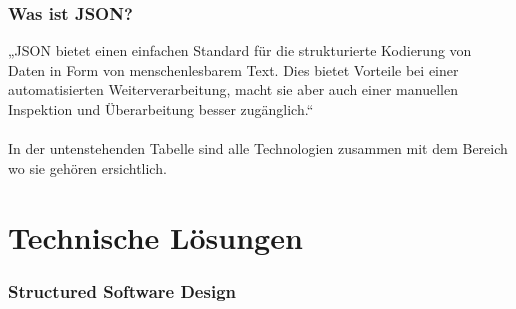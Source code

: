 \subsubsection{Was ist JSON?} 
„JSON bietet einen einfachen Standard für die strukturierte Kodierung von Daten in Form von menschenlesbarem Text. Dies bietet Vorteile bei einer automatisierten Weiterverarbeitung, macht sie aber auch einer manuellen Inspektion und Überarbeitung besser zugänglich.“ \\
\\
In der untenstehenden Tabelle sind alle Technologien zusammen mit dem Bereich wo sie gehören ersichtlich. 
\begin{table}[h]
	\begin{center}
		\caption{Bereiche und Technologien}
		\label{tab:Tabelle1}
	\end{center}
\end{table} 
\section{Technische Lösungen}
\subsubsection{Structured Software Design}
